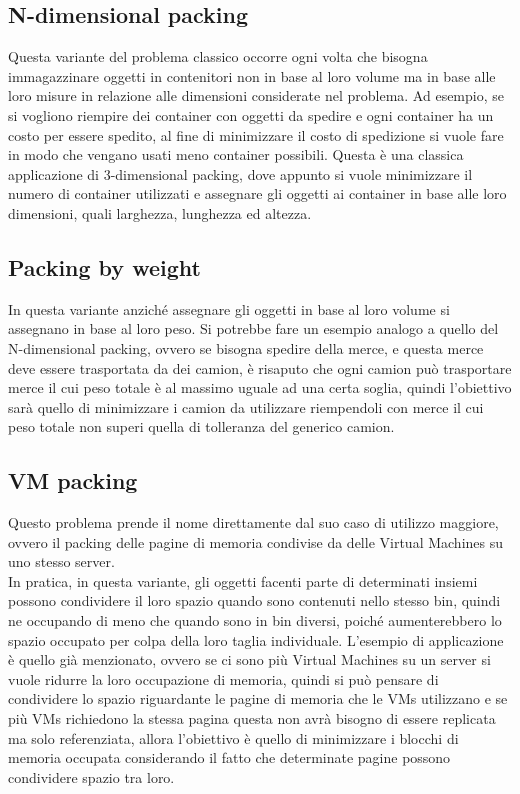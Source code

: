 \subsection{N-dimensional packing}
Questa variante del problema classico occorre ogni volta che bisogna immagazzinare oggetti in contenitori non in base al
loro volume ma in base alle loro misure in relazione alle dimensioni considerate nel problema. Ad esempio, se si vogliono
riempire dei container con oggetti da spedire e ogni container ha un costo per essere spedito, al fine di minimizzare il costo di spedizione si vuole fare in modo
che vengano usati meno container possibili. Questa è una classica applicazione di 3-dimensional packing, dove appunto si vuole
minimizzare il numero di container utilizzati e assegnare gli oggetti ai container in base alle loro dimensioni, quali larghezza,
lunghezza ed altezza.

\subsection{Packing by weight}
In questa variante anziché assegnare gli oggetti in base al loro volume si assegnano in base al loro peso. Si potrebbe fare un
esempio analogo a quello del N-dimensional packing, ovvero se bisogna spedire della merce, e questa merce deve essere trasportata
da dei camion, è risaputo che ogni camion può trasportare merce il cui peso totale è al massimo uguale ad una certa soglia, quindi 
l'obiettivo sarà quello di minimizzare i camion da utilizzare riempendoli con merce il cui peso totale non superi quella di tolleranza
del generico camion.

\subsection{VM packing}
Questo problema prende il nome direttamente dal suo caso di utilizzo maggiore, ovvero il packing delle pagine di memoria
condivise da delle Virtual Machines su uno stesso server.\\
In pratica, in questa variante, gli oggetti facenti parte di determinati insiemi possono condividere il loro spazio quando sono contenuti nello 
stesso bin, quindi ne occupando di meno che quando sono in bin diversi, poiché aumenterebbero lo spazio occupato 
per colpa della loro taglia individuale. L'esempio di applicazione è quello già menzionato, ovvero se ci sono più Virtual Machines
su un server si vuole ridurre la loro occupazione di memoria, quindi si può pensare di condividere lo spazio riguardante le pagine di memoria
che le VMs utilizzano e se più VMs richiedono la stessa pagina questa non avrà bisogno di essere replicata ma solo referenziata,
allora l'obiettivo è quello di minimizzare i blocchi di memoria occupata considerando il fatto che determinate pagine possono
condividere spazio tra loro.

